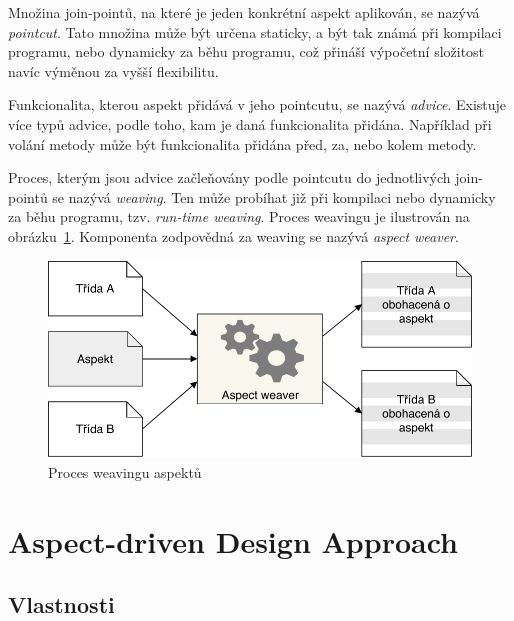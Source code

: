 Množina join-pointů, na které je jeden konkrétní aspekt aplikován, se nazývá \textit{pointcut}.
Tato množina může být určena staticky, a být tak známá při kompilaci programu, nebo
dynamicky za běhu programu, což přináší výpočetní složitost navíc výměnou
za vyšší flexibilitu.

Funkcionalita, kterou aspekt přidává v jeho pointcutu, se nazývá
\textit{advice}. Existuje více typů advice, podle toho, kam je
daná funkcionalita přidána. Například při volání metody může
být funkcionalita přidána před, za, nebo kolem metody.

Proces, kterým jsou advice začleňovány podle pointcutu do
jednotlivých join-pointů se nazývá \textit{weaving}. Ten může
probíhat již při kompilaci nebo dynamicky za běhu programu,
tzv. \textit{run-time weaving}. Proces weavingu je ilustrován
na obrázku~\ref{fig:aspect-weaving}. Komponenta zodpovědná za
weaving se nazývá \textit{aspect weaver}.

\begin{figure}[t]
    \centering
    \includegraphics[keepaspectratio=true, width=0.7\linewidth]{figures/aspect-weaving.pdf}
    \caption{Proces weavingu aspektů}
    \label{fig:aspect-weaving}
\end{figure}

\section{Aspect-driven Design Approach}

\subsection{Vlastnosti}

